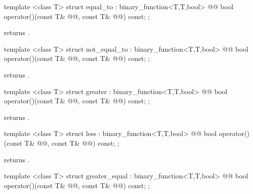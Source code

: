 \documentclass[american,twoside]{book}
\begin{document}
%
\begin{itemdecl}
template <class T> struct equal_to : binary_function<T,T,bool> {
  @@
    bool operator()(const T& @@, const T& @@) const;
};
\end{itemdecl}

\begin{itemdescr}
\pnum
{} returns .
\end{itemdescr}

%
\begin{itemdecl}
template <class T> struct not_equal_to : binary_function<T,T,bool> {
  @@
    bool operator()(const T& @@, const T& @@) const;
};
\end{itemdecl}

\begin{itemdescr}
\pnum
{} returns .
\end{itemdescr}

%
\begin{itemdecl}
template <class T> struct greater : binary_function<T,T,bool> {
  @@
    bool operator()(const T& @@, const T& @@) const;
};
\end{itemdecl}

\begin{itemdescr}
\pnum
{} returns .
\end{itemdescr}

%
\begin{itemdecl}
template <class T> struct less : binary_function<T,T,bool> {
  @@
    bool operator()(const T& @@, const T& @@) const;
};
\end{itemdecl}

\begin{itemdescr}
\pnum
{} returns .
\end{itemdescr}

%
\begin{itemdecl}
template <class T> struct greater_equal : binary_function<T,T,bool> {
  @@
    bool operator()(const T& @@, const T& @@) const;
};
\end{itemdecl}
\end{document}
